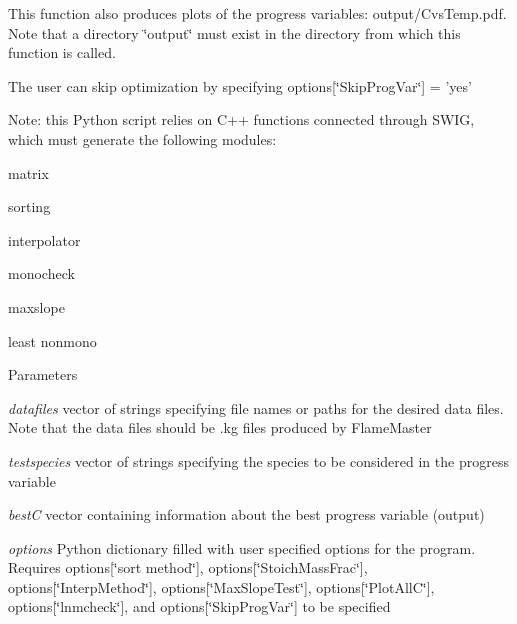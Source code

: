 This function also produces plots of the progress variables: output/CvsTemp.pdf. Note that a directory \char`\"{}output\char`\"{} must exist in the directory from which this function is called.

The user can skip optimization by specifying options\mbox{[}\char`\"{}SkipProgVar\char`\"{}\mbox{]} = 'yes'

Note: this Python script relies on C++ functions connected through SWIG, which must generate the following modules:
\begin{DoxyItemize}
\item matrix
\item sorting
\item interpolator
\item monocheck
\item maxslope
\item least nonmono
\end{DoxyItemize}


\begin{DoxyParams}{Parameters}
\item[{\em datafiles}]vector of strings specifying file names or paths for the desired data files. Note that the data files should be .kg files produced by FlameMaster\item[{\em testspecies}]vector of strings specifying the species to be considered in the progress variable\item[{\em bestC}]vector containing information about the best progress variable (output)\item[{\em options}]Python dictionary filled with user specified options for the program. Requires options\mbox{[}\char`\"{}sort method\char`\"{}\mbox{]}, options\mbox{[}\char`\"{}StoichMassFrac\char`\"{}\mbox{]}, options\mbox{[}\char`\"{}InterpMethod\char`\"{}\mbox{]}, options\mbox{[}\char`\"{}MaxSlopeTest\char`\"{}\mbox{]}, options\mbox{[}\char`\"{}PlotAllC\char`\"{}\mbox{]}, options\mbox{[}\char`\"{}lnmcheck\char`\"{}\mbox{]}, and options\mbox{[}\char`\"{}SkipProgVar\char`\"{}\mbox{]} to be specified \end{DoxyParams}
